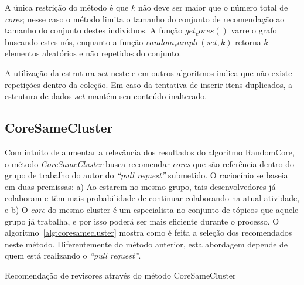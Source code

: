 \documentclass[12pt,openany,oneside,a4paper,english,brazil]{abntbibufjf}
\begin{document}
A única restrição do método é que $k$ não deve ser maior que o número total de \textit{cores}; nesse caso o método limita o tamanho do conjunto de recomendação ao tamanho do conjunto destes indivíduos. A função $get_cores()$ varre o grafo buscando estes nós, enquanto a função $random_sample(set, k)$ retorna $k$ elementos aleatórios e não repetidos do conjunto.

 A utilização da estrutura $set$ neste e em outros algoritmos indica que não existe repetições dentro da coleção. Em caso da tentativa de inserir itens duplicados, a estrutura de dados $set$ mantém seu conteúdo inalterado.

  \subsection{CoreSameCluster}
  Com intuito de aumentar a relevância dos resultados do algoritmo RandomCore, o método \textit{CoreSameCluster} busca recomendar \textit{cores} que são referência dentro do grupo de trabalho do autor do \textit{``pull request''} submetido. O raciocínio se baseia em duas premissas: a) Ao estarem no mesmo grupo, tais desenvolvedores já colaboram e têm mais probabilidade de continuar colaborando na atual atividade, e b) O \textit{core} do mesmo cluster é um especialista no conjunto de tópicos que aquele grupo já trabalha, e por isso poderá ser mais eficiente durante o processo.  O algoritmo~\ref{alg:coresamecluster} mostra como é feita a seleção dos recomendados neste método. Diferentemente do método anterior, esta abordagem depende de quem está realizando o \textit{``pull request''}.


  \begin{algorithm}
  \label{alg:coresamecluster}
   \caption{Recomendação de revisores através do método CoreSameCluster}

  \end{algorithm}
\end{document}
